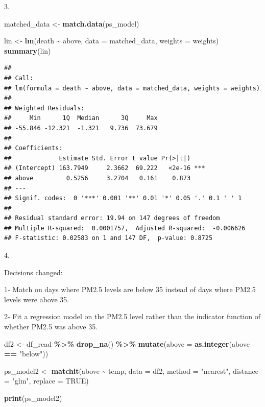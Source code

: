 \documentclass[
]{article}
\newenvironment{Shaded}{\begin{snugshade}}{\end{snugshade}}
\newcommand{\AttributeTok}[1]{\textcolor[rgb]{0.13,0.29,0.53}{#1}}
\newcommand{\ConstantTok}[1]{\textcolor[rgb]{0.56,0.35,0.01}{#1}}
\newcommand{\FunctionTok}[1]{\textcolor[rgb]{0.13,0.29,0.53}{\textbf{#1}}}
\newcommand{\NormalTok}[1]{#1}
\newcommand{\OtherTok}[1]{\textcolor[rgb]{0.56,0.35,0.01}{#1}}
\newcommand{\SpecialCharTok}[1]{\textcolor[rgb]{0.81,0.36,0.00}{\textbf{#1}}}
\newcommand{\StringTok}[1]{\textcolor[rgb]{0.31,0.60,0.02}{#1}}
\begin{document}
3.

\begin{Shaded}
\begin{Highlighting}[]
\NormalTok{matched\_data }\OtherTok{\textless{}{-}} \FunctionTok{match.data}\NormalTok{(ps\_model)}

\NormalTok{lin }\OtherTok{\textless{}{-}} \FunctionTok{lm}\NormalTok{(death }\SpecialCharTok{\textasciitilde{}}\NormalTok{ above, }\AttributeTok{data =}\NormalTok{ matched\_data, }\AttributeTok{weights =}\NormalTok{ weights)}
\FunctionTok{summary}\NormalTok{(lin)}
\end{Highlighting}
\end{Shaded}

\begin{verbatim}
## 
## Call:
## lm(formula = death ~ above, data = matched_data, weights = weights)
## 
## Weighted Residuals:
##     Min      1Q  Median      3Q     Max 
## -55.846 -12.321  -1.321   9.736  73.679 
## 
## Coefficients:
##             Estimate Std. Error t value Pr(>|t|)    
## (Intercept) 163.7949     2.3662  69.222   <2e-16 ***
## above         0.5256     3.2704   0.161    0.873    
## ---
## Signif. codes:  0 '***' 0.001 '**' 0.01 '*' 0.05 '.' 0.1 ' ' 1
## 
## Residual standard error: 19.94 on 147 degrees of freedom
## Multiple R-squared:  0.0001757,  Adjusted R-squared:  -0.006626 
## F-statistic: 0.02583 on 1 and 147 DF,  p-value: 0.8725
\end{verbatim}

4.

Decisions changed:

1- Match on days where PM2.5 levels are below 35 instead of days where
PM2.5 levels were above 35.

2- Fit a regression model on the PM2.5 level rather than the indicator
function of whether PM2.5 was above 35.

\begin{Shaded}
\begin{Highlighting}[]
\NormalTok{df2 }\OtherTok{\textless{}{-}}\NormalTok{ df\_read }\SpecialCharTok{\%\textgreater{}\%} \FunctionTok{drop\_na}\NormalTok{() }\SpecialCharTok{\%\textgreater{}\%} \FunctionTok{mutate}\NormalTok{(}\AttributeTok{above =} \FunctionTok{as.integer}\NormalTok{(above }\SpecialCharTok{==} \StringTok{"below"}\NormalTok{))}

\NormalTok{ps\_model2 }\OtherTok{\textless{}{-}} \FunctionTok{matchit}\NormalTok{(above }\SpecialCharTok{\textasciitilde{}}\NormalTok{ temp,}
                    \AttributeTok{data =}\NormalTok{ df2,}
                    \AttributeTok{method =} \StringTok{"nearest"}\NormalTok{,}
                    \AttributeTok{distance =} \StringTok{"glm"}\NormalTok{,}
                    \AttributeTok{replace =} \ConstantTok{TRUE}\NormalTok{)}

\FunctionTok{print}\NormalTok{(ps\_model2)}
\end{Highlighting}
\end{Shaded}
\end{document}
